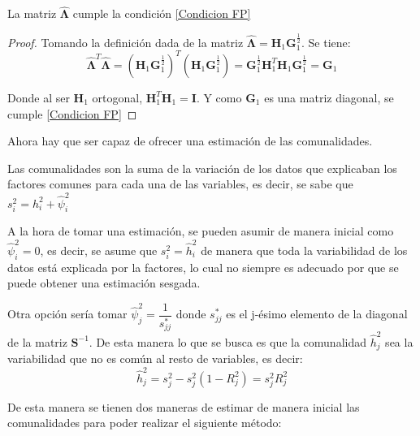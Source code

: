 \begin{propo}
La matriz $\mathbf{\hat{\mathbf{\Lambda}}}$ cumple la condición \eqref{Condicion FP}
\begin{proof}
Tomando la definición dada de la matriz $\mathbf{\hat{\mathbf{\Lambda}}}=\textbf{H}_1\textbf{G}_1^{\frac{1}{2}}$. Se tiene:
\begin{equation}
\mathbf{\hat{\mathbf{\Lambda}}}^T \mathbf{\hat{\mathbf{\Lambda}}}=(\textbf{H}_1\textbf{G}_1^{\frac{1}{2}})^T(\textbf{H}_1\textbf{G}_1^{\frac{1}{2}})= \textbf{G}_1^{\frac{1}{2}}\textbf{H}_1^T\textbf{H}_1\textbf{G}_1^{\frac{1}{2}}=\textbf{G}_1
\end{equation}

\noindent Donde al ser $\textbf{H}_1$ ortogonal, $\textbf{H}_1^T\textbf{H}_1=\textbf{I}$. Y como $\textbf{G}_1$ es una matriz diagonal, se cumple \eqref{Condicion FP}\qedhere
\end{proof}
\end{propo}

\noindent Ahora hay que ser capaz de ofrecer una estimación de las comunalidades.

\noindent Las comunalidades son  la suma de la variación de los datos que explicaban los factores comunes para cada una de las variables, es decir, se sabe que $s^2_i=h_i^2+\hat{\psi}_i^2$

\noindent A la hora de tomar una estimación, se pueden asumir de manera inicial como $\hat{\psi}_i^2=0$, es decir, se asume que $s^2_i=\hat{h}_i^2$ de manera que toda la variabilidad de los datos está explicada por la factores, lo cual no siempre es adecuado por que se puede obtener una estimación sesgada.  

\noindent Otra opción sería tomar $\hat{\psi}_j^2=\dfrac{1}{s^{*}_{jj}}$ donde $s^{*}_{jj}$ es el j-ésimo elemento de la diagonal de la matriz $\textbf{S}^{-1}$. De esta manera lo que se busca es que la comunalidad $\hat{h}_j^2$ sea la variabilidad que no es común al resto de variables, es decir:
\begin{equation}
\hat{h}_j^2=s_j^2-s_j^2(1-R_j^2)=s_j^2R_j^2
\end{equation}
 
\noindent De esta manera se tienen dos maneras de estimar de manera inicial las comunalidades para poder realizar el siguiente método:

